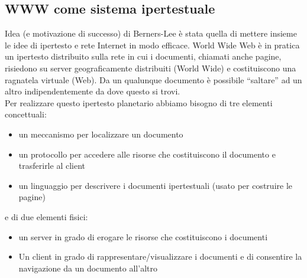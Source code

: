 \documentclass{article}
\begin{document}
\subsection{WWW come sistema ipertestuale}
Idea (e motivazione di successo) di Berners-Lee è stata quella di mettere insieme le idee di ipertesto e rete Internet in modo efficace. World Wide Web è in pratica un ipertesto distribuito sulla rete in cui i documenti, chiamati anche pagine, risiedono su server geograficamente distribuiti (World Wide) e costituiscono una ragnatela virtuale (Web). Da un qualunque documento è possibile “saltare” ad un altro indipendentemente da dove questo si trovi.
\vspace*{0.2cm}\\
Per realizzare questo ipertesto planetario abbiamo
bisogno di tre elementi concettuali:
\begin{itemize}
    \item un meccanismo per localizzare un documento     
    \item un protocollo per accedere alle risorse che costituiscono il documento e trasferirle al client
    \item un linguaggio per descrivere i documenti ipertestuali (usato per costruire le pagine)
\end{itemize}
e di due elementi fisici:
\begin{itemize}
    \item un server in grado di erogare le risorse che costituiscono i documenti
    \item Un client in grado di rappresentare/visualizzare i documenti e di consentire la navigazione da un documento all'altro
\end{itemize}
\end{document}
